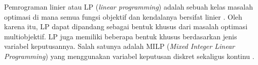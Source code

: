 Pemrograman linier atau LP (\textit{linear programming}) adalah sebuah kelas masalah optimasi di mana semua fungsi objektif dan kendalanya bersifat linier \citep{Ehrgott2005}. Oleh karena itu, LP dapat dipandang sebagai bentuk khusus dari masalah optimasi multiobjektif. LP juga memiliki beberapa bentuk khusus berdasarkan jenis variabel keputusannya. Salah satunya adalah MILP (\textit{Mixed Integer Linear Programming}) yang menggunakan variabel keputusan diskret sekaligus kontinu \citep{Ehrgott2005}. 

